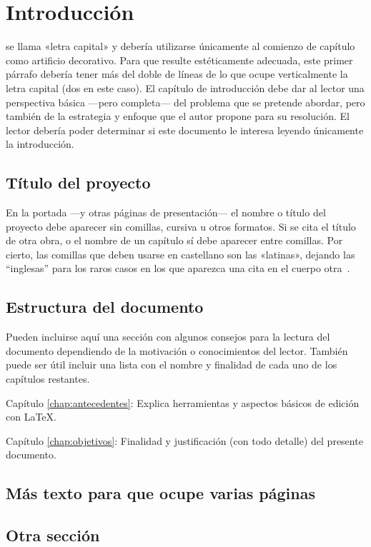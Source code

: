 \chapter{Introducción}

 se llama «letra capital» y debería utilizarse únicamente al
comienzo de capítulo como artificio decorativo. Para que resulte estéticamente
adecuada, este primer párrafo debería tener más del doble de líneas de lo que
ocupe verticalmente la letra capital (dos en este caso). El capítulo de
introducción debe dar al lector una perspectiva básica ---pero completa--- del
problema que se pretende abordar, pero también de la estrategia y enfoque que el
autor propone para su resolución. El lector debería poder determinar si este
documento le interesa leyendo únicamente la introducción.


\section{Título del proyecto}

En la portada ---y otras páginas de presentación--- el nombre o título del
proyecto debe aparecer sin comillas, cursiva u otros formatos. Si se cita el
título de otra obra, o el nombre de un capítulo sí debe aparecer entre
comillas. Por cierto, las comillas que deben usarse en castellano son las
«latinas», dejando las ``inglesas'' para los raros casos en los que aparezca una
cita en el cuerpo otra~\cite{sousa}.


\section{Estructura del documento}

Pueden incluirse aquí una sección con algunos consejos para la lectura del
documento dependiendo de la motivación o conocimientos del lector.  También
puede ser útil incluir una lista con el nombre y finalidad de cada uno de los
capítulos restantes.

\begin{definitionlist}
\item[Capítulo \ref{chap:antecedentes}: \nameref{chap:antecedentes}] Explica herramientas
  y aspectos básicos de edición con \LaTeX.
\item[Capítulo \ref{chap:objetivos}: \nameref{chap:objetivos}] Finalidad y justificación
  (con todo detalle) del presente documento.
\end{definitionlist}


\section{Más texto para que ocupe varias páginas}

\blindtext
\blinditemize[4]
\blindmathpaper

\section{Otra sección}

\blindtext


